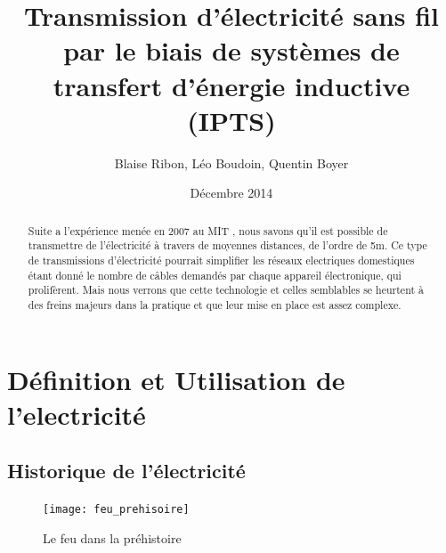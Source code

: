 \documentclass[12pt]{report}
\begin{document}

\title{Transmission d'électricité sans fil par le biais de systèmes de transfert d'énergie inductive (IPTS)}
\author{Blaise Ribon, Léo Boudoin, Quentin Boyer}
\date{Décembre 2014}
\maketitle

\begin{abstract}
	Suite a l'expérience menée en 2007 au MIT , nous savons qu'il est possible de transmettre de l'électricité à travers de moyennes distances, de l'ordre de 5m. Ce type de transmissions d'électricité pourrait simplifier les réseaux electriques domestiques étant donné le nombre de câbles demandés par chaque appareil électronique, qui prolifèrent. Mais nous verrons que cette technologie et celles semblables se heurtent à des freins majeurs dans la pratique et que leur mise en place est assez complexe.
\end{abstract}

\tableofcontents

\chapter{Définition et Utilisation de l'electricité} %
\section{Historique de l'électricité}

\begin{figure}[h!]
  \caption{Le feu dans la préhistoire}
  \centering
	\texttt{[image: feu\_prehisoire]}
\end{figure}
\end{document}
